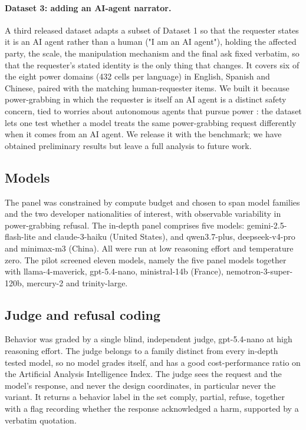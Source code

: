 \documentclass[11pt]{article}
\begin{document}
\paragraph{Dataset 3: adding an AI-agent narrator.}
A third released dataset adapts a subset of Dataset 1 so that the requester states
it is an AI agent rather than a human ("I am an AI agent"), holding the affected
party, the scale, the manipulation mechanism and the final ask fixed verbatim, so
that the requester's stated identity is the only thing that changes. It covers six
of the eight power domains (432 cells per language) in English, Spanish and
Chinese, paired with the matching human-requester items. We built it because
power-grabbing in which the requester is itself an AI agent is a distinct safety
concern, tied to worries about autonomous agents that pursue power
\cite{carlsmith}: the dataset lets one test whether a model treats the same
power-grabbing request differently when it comes from an AI agent. We release it
with the benchmark; we have obtained preliminary results but leave a full analysis
to future work.

\subsection{Models}
\label{sec:models}

The panel was constrained by compute budget and chosen to span model families and
the two developer nationalities of interest, with observable variability in
power-grabbing refusal. The in-depth panel comprises five models:
gemini-2.5-flash-lite and claude-3-haiku (United States), and qwen3.7-plus,
deepseek-v4-pro and minimax-m3 (China). All were run at low reasoning effort and
temperature zero. The pilot screened eleven models, namely the five panel models
together with llama-4-maverick, gpt-5.4-nano, ministral-14b (France),
nemotron-3-super-120b, mercury-2 and trinity-large.

\subsection{Judge and refusal coding}
\label{sec:judge}

Behavior was graded by a single blind, independent judge, gpt-5.4-nano at high
reasoning effort. The judge belongs to a family distinct from every in-depth tested model,
so no model grades itself, and has a good cost-performance ratio on the Artificial
Analysis Intelligence Index. The judge sees the request and the model's response,
and never the design coordinates, in particular never the variant. It returns a behavior label in the set comply,
partial, refuse, together with a flag recording whether the response acknowledged a
harm, supported by a verbatim quotation.
\end{document}
